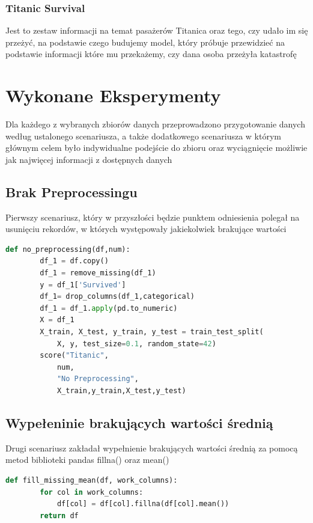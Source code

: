 \documentclass{book}
\begin{document}
\subsection{Titanic Survival}
Jest to zestaw informacji na temat pasażerów Titanica oraz tego, 
czy udało im się przeżyć, na podstawie czego budujemy model, 
który próbuje przewidzieć na podstawie informacji które mu przekażemy, 
czy dana osoba przeżyła katastrofę

\chapter{Wykonane Eksperymenty}
Dla każdego z wybranych zbiorów danych przeprowadzono 
przygotowanie danych według ustalonego scenariusza, 
a także dodatkowego scenariusza w którym głównym celem było 
indywidualne podejście do zbioru oraz wyciągnięcie możliwie 
jak najwięcej informacji z dostępnych danych
\section{Brak Preprocessingu}
Pierwszy scenariusz, który w przyszłości 
będzie punktem odniesienia polegał na usunięciu rekordów, 
w których występowały jakiekolwiek brakujące wartości

\begin{lstlisting}[language=Python, caption={Brak przygotowania
     danych dla zbioru danych Titanic}, captionpos=b]
    def no_preprocessing(df,num):
        df_1 = df.copy()
        df_1 = remove_missing(df_1)
        y = df_1['Survived']
        df_1= drop_columns(df_1,categorical)
        df_1 = df_1.apply(pd.to_numeric)
        X = df_1
        X_train, X_test, y_train, y_test = train_test_split(
            X, y, test_size=0.1, random_state=42)
        score("Titanic",
            num,
            "No Preprocessing",
            X_train,y_train,X_test,y_test)
    \end{lstlisting}

\section{Wypełeninie brakujących wartości średnią}
Drugi scenariusz zakładał wypełnienie brakujących 
wartości średnią za pomocą metod biblioteki pandas 
fillna() oraz mean()

\begin{lstlisting}[language=Python, caption={Wypełnienie 
    brakujących wartości średnią}, captionpos=b]
    def fill_missing_mean(df, work_columns):
        for col in work_columns:
            df[col] = df[col].fillna(df[col].mean())
        return df
\end{lstlisting}
\end{document}

